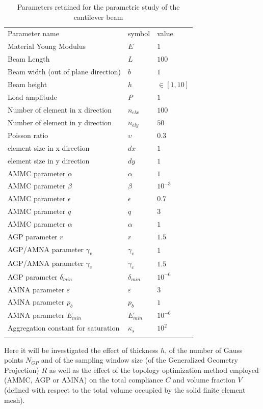 \begin{table}[h!]
\caption{Parameters retained for the parametric study of the cantilever beam}
\label{tab:2}       %
\centering
\begin{tabular}{lll}
\hline\noalign{\smallskip}
Parameter name & symbol & value \\
\noalign{\smallskip}\hline\noalign{\smallskip}
Material Young Modulus & $E$ & $1$\\
Beam Length & $L$ & $100$ \\
Beam width (out of plane direction) & $b$ & $1$\\
Beam height & $h$ & $\in [1,10]$ \\
Load amplitude & $P$ & $1$\\
Number of element in x direction & $n_{elx}$ & $100$\\
Number of element in y direction & $n_{ely}$ & $50$\\
Poisson ratio & $\upsilon$ & $0.3$\\
element size in x direction & $dx$ & $1$\\
element size in y direction & $dy$ & $1$\\
AMMC parameter $\alpha$ & $\alpha$ & $1$\\
AMMC parameter $\beta$ & $\beta$ & $10^{-3}$\\
AMMC parameter $\epsilon$ & $\epsilon$ & $0.7$\\
AMMC parameter $q$ & $q$ & $3$\\
AMMC parameter $\alpha$ & $\alpha$ & $1$\\
AGP parameter $r$ & $r$ & $1.5$\\
AGP/AMNA parameter $\gamma_v$ & $\gamma_v$ & $1$\\
AGP/AMNA parameter $\gamma_c$ & $\gamma_c$ & $1.5$\\
AGP parameter $\delta_{min}$ & $\delta_{min}$ & $10^{-6}$\\
AMNA parameter $\varepsilon$ & $\varepsilon$ & $3$\\
AMNA parameter $p_b$ & $p_b$ & $1$\\
AMNA parameter $E_{min}$ & $E_{min}$ & $10^{-6}$\\
Aggregation constant for saturation & $\kappa_s$ & $10^{2}$\\
\noalign{\smallskip}\hline
\end{tabular}
\end{table}
Here it will be investigated the effect of thickness $h$, of the number of Gauss points $N_{GP}$ and of the sampling window size (of the Generalized Geometry Projection) $R$ as well as the effect of the topology optimization method employed (AMMC, AGP or AMNA) on the total compliance $C$ and volume fraction $V$ (defined with respect to the total volume occupied by the solid finite element mesh).
